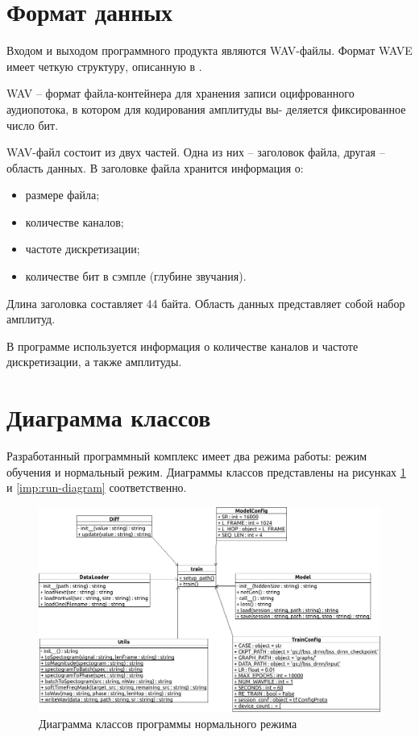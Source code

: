 \section{Формат данных}

Входом и выходом программного продукта являются WAV-файлы. Формат WAVE имеет четкую структуру, описанную в \cite{wav}.

WAV -- формат файла-контейнера для хранения записи оцифрованного аудиопотока, в котором для кодирования амплитуды вы- деляется фиксированное число бит.

WAV-файл состоит из двух частей. Одна из них -- заголовок файла, другая -- область данных. В заголовке файла хранится информация о:

\begin{itemize}
	\item размере файла;
	\item количестве каналов;
	\item частоте дискретизации;
	\item количестве бит в сэмпле (глубине звучания).
\end{itemize}

Длина заголовка составляет 44 байта. Область данных представляет собой набор амплитуд. 

В программе используется информация о количестве каналов и частоте дискретизации, а также амплитуды.

\section{Диаграмма классов}

Разработанный программный комплекс имеет два режима работы: режим обучения и нормальный режим. Диаграммы классов представлены на рисунках \ref{imp:train} и \ref{imp:run-diagram} соответственно.

\begin{figure}
	\centering
	\includegraphics[width=\textwidth]{inc/img/train}
	\caption{Диаграмма классов программы нормального режима}
	\label{imp:train}
\end{figure}

